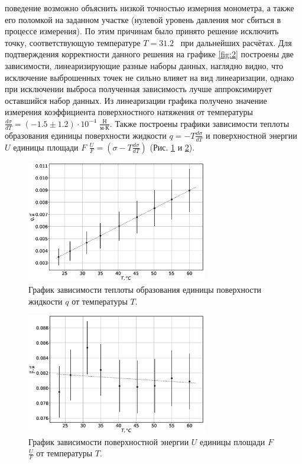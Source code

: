 \documentclass[12pt]{article}
\begin{document}
поведение возможно объяснить низкой точностью измерния монометра, а также его поломкой на заданном 
участке (нулевой уровень давления мог сбиться в процессе измерения). По этим причинам было принято решение 
исключить точку, соответствующую температуре $T = 31.2$ \textcelsius \, при дальнейших расчётах. 
Для подтверждения корректности данного решения на графике \ref{fig:2} построены две зависимости, 
линеаризирующие разные наборы данных, наглядно видно, что исключение выброшенных точек не сильно 
влияет на вид линеаризации, однако при исключении выброса полученная зависимость лучше аппроксимирует 
оставшийся набор данных.
Из линеаризации графика получено значение измерения коэффициента поверхностного натяжения от температуры 
$\frac{d\sigma }{dT} = (-1.5 \pm 1.2) \cdot 10 ^ {-4}$ $\frac{\text{Н}}{\text{м}\cdot\text{К}}$. Также построены 
графики зависимости теплоты образования единицы поверхности жидкости $q = -T \frac{d \sigma}{d T}$ и 
поверхностной энергии $U$ единицы площади $F$ $\frac{U}{F} = \left( \sigma - T \frac{d \sigma }{d T} \right) $ (Рис. \ref{fig:3} и \ref{fig:4}).
\begin{figure}
    \centering
    \includegraphics[width=0.7\textwidth]{qT.eps}
    \caption{График зависимости теплоты образования единицы поверхности жидкости $q$ от температуры $T$.}
    \label{fig:3}
\end{figure}
\begin{figure}
    \centering
    \includegraphics[width=0.7\textwidth]{qUF.eps}
    \caption{График зависимости поверхностной энергии $U$ единицы площади $F$ $\frac{U}{F}$ от температуры $T$.}
    \label{fig:4}
\end{figure}
\end{document}

